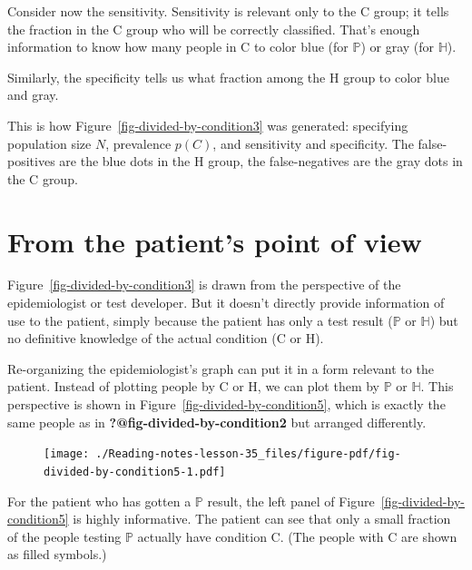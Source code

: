 \documentclass[
  letterpaper,
  DIV=11,
  numbers=noendperiod,
  oneside]{scrreprt}
\begin{document}
Consider now the sensitivity. Sensitivity is relevant only to the C
group; it tells the fraction in the C group who will be correctly
classified. That's enough information to know how many people in C to
color blue (for \(\mathbb{P}\)) or gray (for \(\mathbb{H}\)).

Similarly, the specificity tells us what fraction among the H group to
color blue and gray.

This is how Figure~\ref{fig-divided-by-condition3} was generated:
specifying population size \(N\), prevalence \(p(C)\), and sensitivity
and specificity. The false-positives are the blue dots in the H group,
the false-negatives are the gray dots in the C group.

\hypertarget{from-the-patients-point-of-view}{%
\section{From the patient's point of
view}\label{from-the-patients-point-of-view}}

Figure~\ref{fig-divided-by-condition3} is drawn from the perspective of
the epidemiologist or test developer. But it doesn't directly provide
information of use to the patient, simply because the patient has only a
test result (\(\mathbb{P}\) or \(\mathbb{H}\)) but no definitive
knowledge of the actual condition (C or H).

Re-organizing the epidemiologist's graph can put it in a form relevant
to the patient. Instead of plotting people by C or H, we can plot them
by \(\mathbb{P}\) or \(\mathbb{H}\). This perspective is shown in
Figure~\ref{fig-divided-by-condition5}, which is exactly the same people
as in \textbf{?@fig-divided-by-condition2} but arranged differently.

\begin{figure}


{\centering \texttt{[image: ./Reading-notes-lesson-35\_files/figure-pdf/fig-divided-by-condition5-1.pdf]}

}

\end{figure}

For the patient who has gotten a \(\mathbb{P}\) result, the left panel
of Figure~\ref{fig-divided-by-condition5} is highly informative. The
patient can see that only a small fraction of the people testing
\(\mathbb{P}\) actually have condition C. (The people with C are shown
as filled symbols.)
\end{document}
